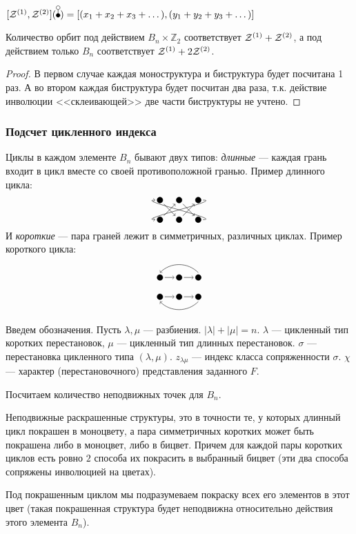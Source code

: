 \begin{example}
$[\Zone, \Ztwo](\dB) = [(x_1 + x_2 + x_3 + \dots), (y_1 + y_2 + y_3 + \dots)]$
\end{example}

\begin{statement}
Количество орбит под действием $B_n \times \mathbb Z_2$ соответствует $\mathcal
Z^{(1)} + \mathcal Z^{(2)}$, а под действием только $B_n$ соответствует $\mathcal Z^{(1)} + 2\mathcal
Z^{(2)}$. 
\end{statement}
\begin{proof}
В первом случае каждая моноструктура и биструктура будет посчитана 1 раз.
А во втором каждая биструктура будет посчитан два раза, т.к. действие инволюции
<<склеивающей>> две части биструктуры не учтено.
\end{proof}

\subsubsection{Подсчет цикленного индекса}
\begin{remark}
Циклы в каждом элементе $B_n$ бывают двух типов:
\emph{длинные} --- каждая грань входит в цикл вместе со своей противоположной
гранью. Пример длинного цикла: $$\dhoB$$
И \emph{короткие} --- пара граней
лежит в симметричных, различных циклах. Пример короткого цикла: $$\dhoA$$
\end{remark}

Введем обозначения. Пусть $\lambda, \mu$ --- разбиения. $|\lambda| + |\mu| = n$.
$\lambda$ --- цикленный тип коротких перестановок, $\mu$ --- цикленный тип длинных перестановок. 
$\sigma$ --- перестановка цикленного типа $(\lambda, \mu)$. 
$z_{\lambda \mu}$ --- индекс класса сопряженности $\sigma$.
$\chi$ --- характер (перестановочного) представления заданного $F$.


Посчитаем количество неподвижных точек для $B_n$.
\begin{statement}
Неподвижные раскрашенные структуры, это в точности
те, у которых длинный цикл покрашен в моноцвету, а пара симметричных коротких 
может быть покрашена либо в моноцвет, либо в бицвет. Причем для каждой пары
коротких циклов есть ровно $2$ способа их покрасить в выбранный бицвет (эти
два способа сопряжены инволюцией на цветах).
\end{statement}
Под покрашенным циклом мы подразумеваем покраску всех его элементов в этот цвет
(такая покрашенная структура будет неподвижна относительно действия этого
элемента $B_n$).

